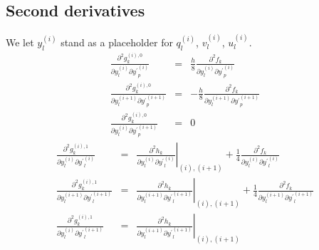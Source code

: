 \documentclass[a4paper]{article}
\begin{document}
\subsection{Second derivatives}
We let $y_l^{(i)}$ stand as a placeholder for $q_l^{(i)}$, $v_l^{(i)}$, $u_l^{(i)}$.
\begin{eqnarray}
\frac{\partial^2 g_k^{(i),0}}{\partial y_l^{(i)} \partial {y^\prime}_p^{(i)}} &=&
\frac{h}{8} \frac{\partial^2 f_k}{\partial y_l^{(i)} \partial {y^\prime}_p^{(i)}}\\
\frac{\partial^2 g_k^{(i),0}}{\partial y_l^{(i+1)} \partial {y^\prime}_p^{(i+1)}} &=&
-\frac{h}{8} \frac{\partial^2 f_k}{\partial y_l^{(i+1)} \partial {y^\prime}_p^{(i+1)}}\\
\frac{\partial^2 g_k^{(i),0}}{\partial y_l^{(i)} \partial {y^\prime}_p^{(i+1)}} &=& 0
\end{eqnarray}
\begin{eqnarray}
\frac{\partial^2 g_k^{(i),1}}{\partial y_l^{(i)} \partial {y^\prime}_l^{(i)}} &=&
\left. \frac{\partial^2 h_k}{\partial y_l^{(i)} \partial {y^\prime}_l^{(i)}} \right|_{(i), (i+1)} +
\frac{1}{4} \frac{\partial^2 f_k}{\partial y_l^{(i)} \partial {y^\prime}_l^{(i)}}\\
\frac{\partial^2 g_k^{(i),1}}{\partial y_l^{(i+1)} \partial {y^\prime}_l^{(i+1)}} &=&
\left. \frac{\partial^2 h_k}{\partial y_l^{(i+1)} \partial {y^\prime}_l^{(i+1)}} \right|_{(i), (i+1)} +
\frac{1}{4} \frac{\partial^2 f_k}{\partial y_l^{(i+1)} \partial {y^\prime}_l^{(i+1)}}\\
\frac{\partial^2 g_k^{(i),1}}{\partial y_l^{(i)} \partial {y^\prime}_l^{(i+1)}} &=&
\left. \frac{\partial^2 h_k}{\partial y_l^{(i+1)} \partial {y^\prime}_l^{(i+1)}} \right|_{(i), (i+1)}
\end{eqnarray}
\end{document}
